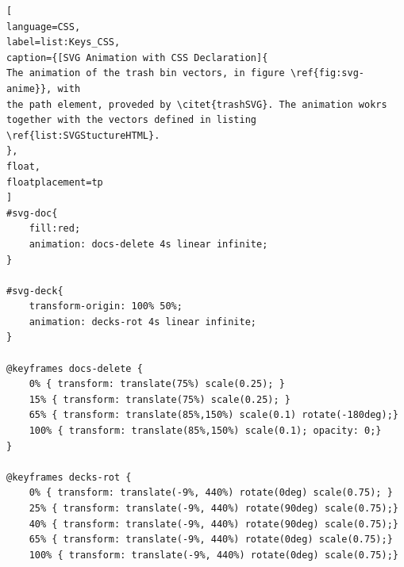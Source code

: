 \begin{lstlisting}[
language=CSS,
label=list:Keys_CSS,
caption={[SVG Animation with CSS Declaration]{
The animation of the trash bin vectors, in figure \ref{fig:svg-anime}}, with 
the path element, proveded by \citet{trashSVG}. The animation wokrs together with the vectors defined in listing \ref{list:SVGStuctureHTML}.
},
float,
floatplacement=tp
]
#svg-doc{
	fill:red;
	animation: docs-delete 4s linear infinite;
}

#svg-deck{
	transform-origin: 100% 50%;
	animation: decks-rot 4s linear infinite;
}

@keyframes docs-delete {
	0% { transform: translate(75%) scale(0.25); }
	15% { transform: translate(75%) scale(0.25); }
	65% { transform: translate(85%,150%) scale(0.1) rotate(-180deg);}
	100% { transform: translate(85%,150%) scale(0.1); opacity: 0;}
}

@keyframes decks-rot {
	0% { transform: translate(-9%, 440%) rotate(0deg) scale(0.75); }
	25% { transform: translate(-9%, 440%) rotate(90deg) scale(0.75);}
	40% { transform: translate(-9%, 440%) rotate(90deg) scale(0.75);}
	65% { transform: translate(-9%, 440%) rotate(0deg) scale(0.75);}
	100% { transform: translate(-9%, 440%) rotate(0deg) scale(0.75);}

\end{lstlisting}


